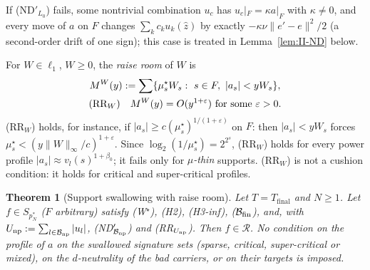 \documentclass[10pt]{amsart}
\newtheorem{theorem}{Theorem}[section]
\theoremstyle{definition}
\theoremstyle{remark}
\newcommand{\Rec}{\mathcal R}
\newcommand{\zh}{\hat z}
\begin{document}
If (ND$'_{L_0}$) fails, some nontrivial combination $u_c$ has $u_c|_F=\kappa
a|_F$ with $\kappa\ne0$, and every move of $a$ on $F$ changes $\sum_kc_k
u_k(\zh)$ by exactly $-\kappa\nu\|e'-e\|^2/2$ (a second-order drift of one
sign); this case is treated in Lemma~\ref{lem:II-ND} below.

For $W\in\ell_1$, $W\ge0$, the \emph{raise room} of $W$ is
\begin{gather*}
 M^W(y):=\sum\{\mu^\star_sW_s:\ s\in F,\ |a_s|<yW_s\},\\
 \textup{(RR$_W$)}\quad M^W(y)=O(y^{1+\varepsilon})\ \text{for some }
 \varepsilon>0 .
\end{gather*}
(RR$_W$) holds, for instance, if $|a_s|\ge c(\mu^\star_s)^{1/(1+\varepsilon)}$
on $F$: then $|a_s|<yW_s$ forces $\mu^\star_s<(y\|W\|_\infty/c)^{1+\varepsilon}$.
Since $\log_2(1/\mu^\star_s)=2^{2^s}$, (RR$_W$) holds for every power profile
$|a_s|\approx v_l(s)^{1+\beta_0}$; it fails only for \emph{$\mu$-thin}
supports.  (RR$_W$) is not a cushion condition: it holds for critical and
super-critical profiles.

\begin{theorem}[Support swallowing with raise room]\label{thm:II-RS}
Let $T=T_{\mathrm{final}}$ and $N\ge1$.  Let $f\in S_{p_N^*}$ \textup{(}$F$
arbitrary\textup{)} satisfy \textup{(W$^\star$)}, \textup{(H2)},
\textup{(H3-inf)}, \textup{($\mathcal B_{\rm fin}$)}, and, with
$U_{\rm np}:=\sum_{l\in\mathcal B_{\rm np}}|u_l|$,
\textup{(ND$'_{\mathcal B_{\rm np}}$)} and \textup{(RR$_{U_{\rm np}}$)}.  Then
$f\in\Rec$.  No condition on the profile of $a$ on the swallowed signature
sets \textup{(}sparse, critical, super-critical or mixed\textup{)}, on the
$d$-neutrality of the bad carriers, or on their targets is imposed.
\end{theorem}
\end{document}
